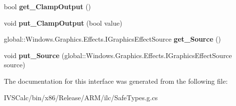 \begin{DoxyCompactItemize}
bool {\bfseries get\+\_\+\+Clamp\+Output} ()
\item 
\mbox{\label{interface_microsoft_1_1_graphics_1_1_canvas_1_1_effects_1_1_i_discrete_transfer_effect_a674445951c0f7389c7376ba4fb72b347}} 
void {\bfseries put\+\_\+\+Clamp\+Output} (bool value)
\item 
\mbox{\label{interface_microsoft_1_1_graphics_1_1_canvas_1_1_effects_1_1_i_discrete_transfer_effect_ac78c61e1d025a8b75cbb2d99187231eb}} 
global\+::\+Windows.\+Graphics.\+Effects.\+I\+Graphics\+Effect\+Source {\bfseries get\+\_\+\+Source} ()
\item 
\mbox{\label{interface_microsoft_1_1_graphics_1_1_canvas_1_1_effects_1_1_i_discrete_transfer_effect_a1001701a5d02d759eba0ed9346a9b4d7}} 
void {\bfseries put\+\_\+\+Source} (global\+::\+Windows.\+Graphics.\+Effects.\+I\+Graphics\+Effect\+Source source)
\end{DoxyCompactItemize}


The documentation for this interface was generated from the following file\+:\begin{DoxyCompactItemize}
\item 
I\+V\+S\+Calc/bin/x86/\+Release/\+A\+R\+M/ilc/Safe\+Types.\+g.\+cs\end{DoxyCompactItemize}
